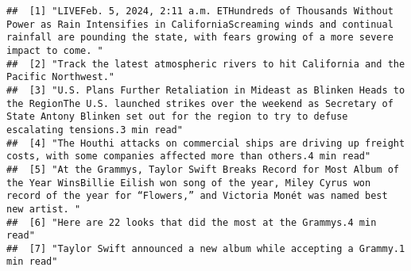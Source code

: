 \documentclass[
]{article}
\begin{document}
\begin{verbatim}
##  [1] "LIVEFeb. 5, 2024, 2:11 a.m. ETHundreds of Thousands Without Power as Rain Intensifies in CaliforniaScreaming winds and continual rainfall are pounding the state, with fears growing of a more severe impact to come. "                                                                                                                                                                                               
##  [2] "Track the latest atmospheric rivers to hit California and the Pacific Northwest."                                                                                                                                                                                                                                                                                                                                     
##  [3] "U.S. Plans Further Retaliation in Mideast as Blinken Heads to the RegionThe U.S. launched strikes over the weekend as Secretary of State Antony Blinken set out for the region to try to defuse escalating tensions.3 min read"                                                                                                                                                                                       
##  [4] "The Houthi attacks on commercial ships are driving up freight costs, with some companies affected more than others.4 min read"                                                                                                                                                                                                                                                                                        
##  [5] "At the Grammys, Taylor Swift Breaks Record for Most Album of the Year WinsBillie Eilish won song of the year, Miley Cyrus won record of the year for “Flowers,” and Victoria Monét was named best new artist. "                                                                                                                                                                                                       
##  [6] "Here are 22 looks that did the most at the Grammys.4 min read"                                                                                                                                                                                                                                                                                                                                                        
##  [7] "Taylor Swift announced a new album while accepting a Grammy.1 min read"                                                                                                                                                                                                                                                                                                                                               

\end{verbatim}
\end{document}
